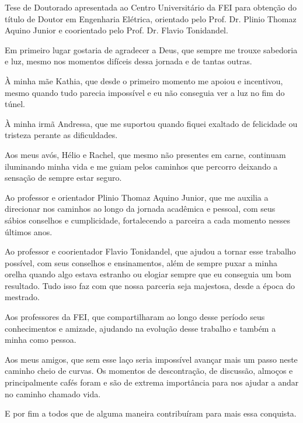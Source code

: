 \maketitle{}

\begin{folhaderosto}
Tese de Doutorado apresentada ao Centro Universitário da FEI para obtenção do título de Doutor em Engenharia Elétrica, orientado pelo Prof. Dr. Plinio Thomaz Aquino Junior e coorientado pelo Prof. Dr. Flavio Tonidandel.
\end{folhaderosto}




\begin{agradecimentos}
Em primeiro lugar gostaria de agradecer a Deus, que sempre me trouxe sabedoria e luz, mesmo nos momentos difíceis dessa jornada e de tantas outras.

À minha mãe Kathia, que desde o primeiro momento me apoiou e incentivou, mesmo quando tudo parecia impossível e eu não conseguia ver a luz no fim do túnel.

À minha irmã Andressa, que me suportou quando fiquei exaltado de felicidade ou tristeza perante as dificuldades.

Aos meus avós, Hélio e Rachel, que mesmo não presentes em carne, continuam iluminando minha vida e me guiam pelos caminhos que percorro deixando a sensação de sempre estar seguro.

Ao professor e orientador Plinio Thomaz Aquino Junior, que me auxilia a direcionar nos caminhos ao longo da jornada acadêmica e pessoal, com seus sábios conselhos e cumplicidade, fortalecendo a parceira a cada momento nesses últimos anos.

Ao professor e coorientador Flavio Tonidandel, que ajudou a tornar esse trabalho possível, com seus conselhos e ensinamentos, além de sempre puxar a minha orelha quando algo estava estranho ou elogiar sempre que eu conseguia um bom resultado. Tudo isso faz com que nossa parceria seja majestosa, desde a época do mestrado.

Aos professores da FEI, que compartilharam ao longo desse período seus conhecimentos e amizade, ajudando na evolução desse trabalho e também a minha como pessoa.

Aos meus amigos, que sem esse laço seria impossível avançar mais um passo neste caminho cheio de curvas. Os momentos de descontração, de discussão, almoços e principalmente cafés foram e são de extrema importância para nos ajudar a andar no caminho chamado vida.

E por fim a todos que de alguma maneira contribuíram para mais essa conquista.

\end{agradecimentos}

